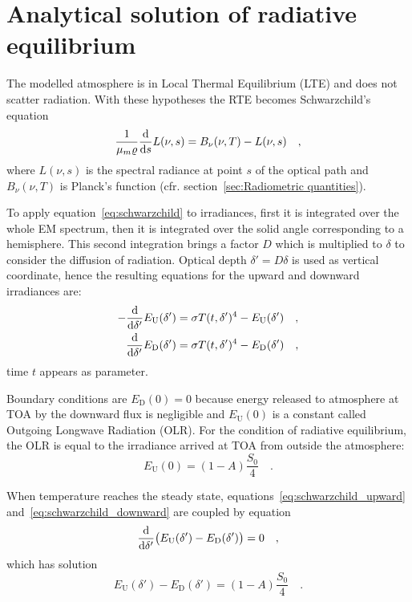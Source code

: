 \documentclass[a4paper,10pt,twocolumn,\classoptions]{article}
\begin{document}
\section{Analytical solution of radiative equilibrium}
The modelled atmosphere is in Local Thermal Equilibrium (LTE) and does not scatter radiation. With these hypotheses the RTE becomes Schwarzchild's equation
\begin{equation}
  \label{eq:schwarzchild}
  \frac{1}{\mu_m \varrho} \odv*{L(\nu, s)}{s} = B_\nu(\nu, T) - L(\nu, s)
  \quad ,
\end{equation}
where $L(\nu, s)$ is the spectral radiance at point $s$ of the optical path and $B_\nu(\nu, T)$ is Planck's function (cfr. section~\ref{sec:Radiometric quantities}).

To apply equation~\eqref{eq:schwarzchild} to irradiances, first it is integrated over the whole EM spectrum, then it is integrated over the solid angle corresponding to a hemisphere. This second integration brings a factor $D$ which is multiplied to $\delta$ to consider the diffusion of radiation.
Optical depth $\delta' = D \delta$ is used as vertical coordinate, hence the resulting equations for the upward and downward irradiances are:
\begin{align}
  \label{eq:schwarzchild_upward}
  - \odv*{E_\text{U}(\delta')}{\delta'} & = \sigma T(t, \delta')^4 - E_\text{U}(\delta') \quad , \\
  \label{eq:schwarzchild_downward}
  \odv*{E_\text{D}(\delta')}{\delta'} & = \sigma T(t, \delta')^4 - E_\text{D}(\delta')
  \quad ,
\end{align}
time $t$ appears as parameter.

Boundary conditions are $E_\text{D}(0) = 0$ because energy released to atmosphere at TOA by the downward flux is negligible and $E_\text{U}(0)$ is a constant called Outgoing Longwave Radiation (OLR).
For the condition of radiative equilibrium, the OLR is equal to the irradiance arrived at TOA from outside the atmosphere:
\begin{equation}
  \label{eq:radiative_equilibrium}
  E_\text{U}(0) = (1 - A) \frac{S_0}{4}
  \quad .
\end{equation}

When temperature reaches the steady state, equations~\eqref{eq:schwarzchild_upward} and~\eqref{eq:schwarzchild_downward} are coupled by equation
\begin{equation}
  \label{eq:temperature_steady_state}
  \odv*{\big( E_\text{U}(\delta') - E_\text{D}(\delta') \big)}{\delta'} = 0
  \quad ,
\end{equation}
which has solution
\begin{equation}
  \label{eq:temperature_steady_state_solution}
  E_\text{U}(\delta') - E_\text{D}(\delta') = (1 - A) \frac{S_0}{4}
  \quad .
\end{equation}
\end{document}
